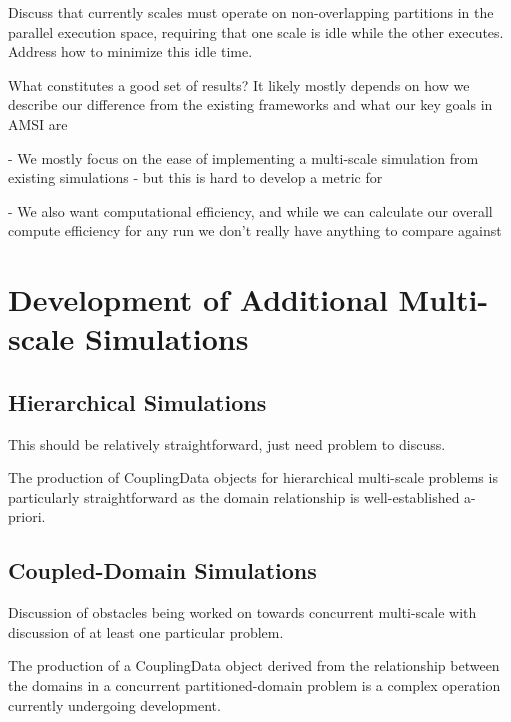\documentclass[review]{siamart1116}
\begin{document}
Discuss that currently scales must operate on non-overlapping partitions in the parallel execution space, requiring that one scale is idle while the other executes. Address how to minimize this idle time.

What constitutes a good set of results? It likely mostly depends on how we describe our difference from the existing frameworks and what our key goals in AMSI are

  - We mostly focus on the ease of implementing a multi-scale simulation from existing simulations - but this is hard to develop a metric for
  
  - We also want computational efficiency, and while we can calculate our overall compute efficiency for any run we don't really have anything to compare against

\section{Development of Additional Multi-scale Simulations}\label{sec:new-simulations}

\subsection{Hierarchical Simulations}\label{sec:info-passing-examples}

This should be relatively straightforward, just need problem to discuss.

The production of CouplingData objects for hierarchical multi-scale problems is particularly straightforward as the domain relationship is well-established a-priori. 

\subsection{Coupled-Domain Simulations}\label{sec:concurrent-examples}

Discussion of obstacles being worked on towards concurrent multi-scale with discussion of at least one particular problem.

The production of a CouplingData object derived from the relationship between the domains in a concurrent partitioned-domain problem is a complex operation currently undergoing development. 




\end{document}
